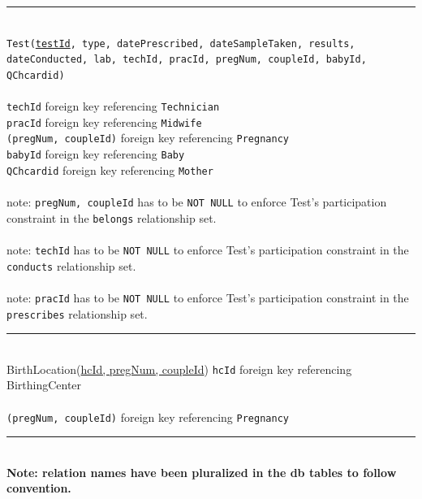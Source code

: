\documentclass[10pt, letterpaper]{article}
\newcommand{\code}[1]{\texttt{#1}}
\newcommand{\dline}{\par\noindent\rule{\textwidth}{0.2pt}\\}
\begin{document}
\dline
\code{Test(\underline{testId}, type, datePrescribed, dateSampleTaken, results, dateConducted, lab, techId, pracId, pregNum, coupleId, babyId, QChcardid)}\\
\\
\code{techId} foreign key referencing \code{Technician}\\
\code{pracId} foreign key referencing \code{Midwife}\\
\code{(pregNum, coupleId)} foreign key referencing \code{Pregnancy}\\
\code{babyId} foreign key referencing \code{Baby}\\
\code{QChcardid} foreign key referencing \code{Mother}\\
\\
note: \code{pregNum, coupleId} has to be \code{NOT NULL} to enforce Test's participation constraint in the \code{belongs} relationship set.\\
\\
note: \code{techId} has to be \code{NOT NULL} to enforce Test's participation constraint in the \code{conducts} relationship set.\\
\\
note: \code{pracId} has to be \code{NOT NULL} to enforce Test's participation constraint in the \code{prescribes} relationship set.
\dline
BirthLocation(\underline{hcId, pregNum, coupleId})
\code{hcId} foreign key referencing BirthingCenter\\
\\
\code{(pregNum, coupleId)} foreign key referencing \code{Pregnancy}
\dline
\noindent \textbf{Note: relation names have been pluralized in the db tables to follow convention.}\\
\\
\end{document}
